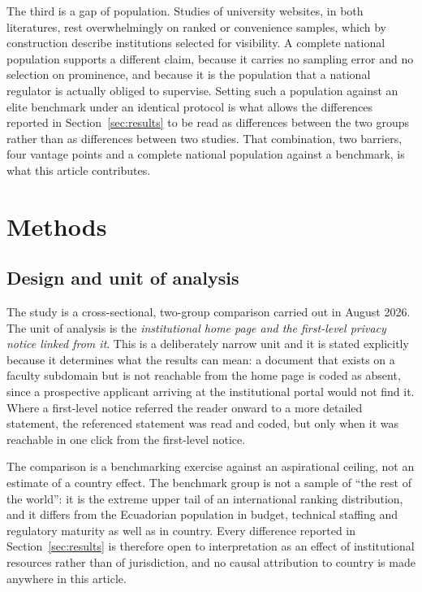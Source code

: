 \documentclass[pdflatex,sn-basic,Numbered]{sn-jnl}
\theoremstyle{thmstyleone}
\theoremstyle{thmstyletwo}
\theoremstyle{thmstylethree}
\begin{document}
The third is a gap of population. Studies of university websites, in both literatures, rest overwhelmingly on ranked or convenience samples, which by construction describe institutions selected for visibility. A complete national population supports a different claim, because it carries no sampling error and no selection on prominence, and because it is the population that a national regulator is actually obliged to supervise. Setting such a population against an elite benchmark under an identical protocol is what allows the differences reported in Section~\ref{sec:results} to be read as differences between the two groups rather than as differences between two studies. That combination, two barriers, four vantage points and a complete national population against a benchmark, is what this article contributes.

\section{Methods}\label{sec:methods}

\subsection{Design and unit of analysis}\label{sec:methods-design}

The study is a cross-sectional, two-group comparison carried out in August 2026. The unit of analysis is the \emph{institutional home page and the first-level privacy notice linked from it}. This is a deliberately narrow unit and it is stated explicitly because it determines what the results can mean: a document that exists on a faculty subdomain but is not reachable from the home page is coded as absent, since a prospective applicant arriving at the institutional portal would not find it. Where a first-level notice referred the reader onward to a more detailed statement, the referenced statement was read and coded, but only when it was reachable in one click from the first-level notice.

The comparison is a benchmarking exercise against an aspirational ceiling, not an estimate of a country effect. The benchmark group is not a sample of ``the rest of the world'': it is the extreme upper tail of an international ranking distribution, and it differs from the Ecuadorian population in budget, technical staffing and regulatory maturity as well as in country. Every difference reported in Section~\ref{sec:results} is therefore open to interpretation as an effect of institutional resources rather than of jurisdiction, and no causal attribution to country is made anywhere in this article.
\end{document}
